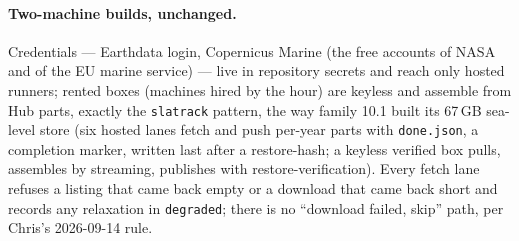 \documentclass[10pt]{article}
\newcommand{\code}[1]{\texttt{#1}}
\begin{document}
\paragraph{Two-machine builds, unchanged.} Credentials --- Earthdata login,
Copernicus Marine (the free accounts of NASA and of the EU marine service) --- live in repository secrets and reach only hosted runners;
rented boxes (machines hired by the hour) are keyless and assemble from Hub parts, exactly the
\code{slatrack} pattern, the way family 10.1 built its 67\,GB sea-level store (six hosted lanes fetch and push per-year parts with
\code{done.json}, a completion marker, written last after a restore-hash; a keyless verified box
pulls, assembles by streaming, publishes with restore-verification). Every
fetch lane refuses a listing that came back empty or a download that came back
short and records any relaxation in \code{degraded}; there is no
``download failed, skip'' path, per Chris's 2026-09-14 rule.
\end{document}
